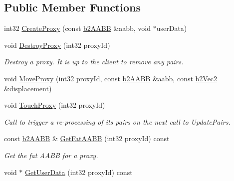 \subsection*{Public Member Functions}
\begin{DoxyCompactItemize}
\item 
int32 \hyperlink{classb2_broad_phase_ae2f7af756bc55ece45221466c5af449c}{Create\+Proxy} (const \hyperlink{structb2_a_a_b_b}{b2\+A\+A\+BB} \&aabb, void $\ast$user\+Data)
\item 
void \hyperlink{classb2_broad_phase_a84f0fb227dc01a9b9baa55c7b8c68984}{Destroy\+Proxy} (int32 proxy\+Id)\hypertarget{classb2_broad_phase_a84f0fb227dc01a9b9baa55c7b8c68984}{}\label{classb2_broad_phase_a84f0fb227dc01a9b9baa55c7b8c68984}

\begin{DoxyCompactList}\small\item\em Destroy a proxy. It is up to the client to remove any pairs. \end{DoxyCompactList}\item 
void \hyperlink{classb2_broad_phase_a01dc18a19c2b5d0cc1d9cd8c8554234c}{Move\+Proxy} (int32 proxy\+Id, const \hyperlink{structb2_a_a_b_b}{b2\+A\+A\+BB} \&aabb, const \hyperlink{structb2_vec2}{b2\+Vec2} \&displacement)
\item 
void \hyperlink{classb2_broad_phase_a67b296431ebbc7b44037f21d645d9166}{Touch\+Proxy} (int32 proxy\+Id)\hypertarget{classb2_broad_phase_a67b296431ebbc7b44037f21d645d9166}{}\label{classb2_broad_phase_a67b296431ebbc7b44037f21d645d9166}

\begin{DoxyCompactList}\small\item\em Call to trigger a re-\/processing of it\textquotesingle{}s pairs on the next call to Update\+Pairs. \end{DoxyCompactList}\item 
const \hyperlink{structb2_a_a_b_b}{b2\+A\+A\+BB} \& \hyperlink{classb2_broad_phase_a7b00ac700db52e52248a25397007d4ff}{Get\+Fat\+A\+A\+BB} (int32 proxy\+Id) const \hypertarget{classb2_broad_phase_a7b00ac700db52e52248a25397007d4ff}{}\label{classb2_broad_phase_a7b00ac700db52e52248a25397007d4ff}

\begin{DoxyCompactList}\small\item\em Get the fat A\+A\+BB for a proxy. \end{DoxyCompactList}\item 
void $\ast$ \hyperlink{classb2_broad_phase_a89c099e95237d68577376d8f9a4ed013}{Get\+User\+Data} (int32 proxy\+Id) const \hypertarget{classb2_broad_phase_a89c099e95237d68577376d8f9a4ed013}{}\label{classb2_broad_phase_a89c099e95237d68577376d8f9a4ed013}


\end{DoxyCompactItemize}
